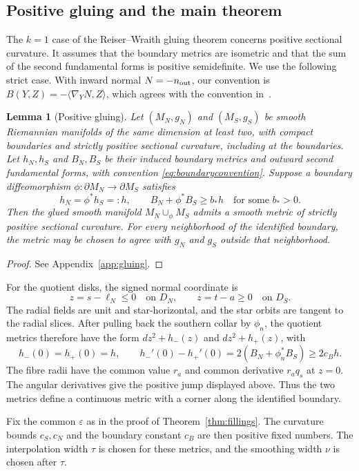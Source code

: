 \documentclass[12pt]{amsart}
\numberwithin{equation}{section}
\newtheorem{lemma}[theorem]{Lemma}
\theoremstyle{remark}
\newcommand{\eps}{\varepsilon}
\begin{document}
\subsection{Positive gluing and the main theorem}
The \(k=1\) case of the Reiser--Wraith gluing theorem
\cite[Theorem~A(i)]{RW} concerns positive sectional curvature.
It assumes that the boundary metrics are isometric and that the sum
of the second fundamental forms is positive semidefinite. We use the
following strict case. With inward normal \(N=-n_{\rm out}\), our
convention is \(B(Y,Z)=-\langle\nabla_YN,Z\rangle\), which agrees
with the convention in~\cite{RW}.

\begin{lemma}[Positive gluing]\label{lem:gluing}\label{thm:RW}
Let \((M_N,g_N)\) and \((M_S,g_S)\) be smooth Riemannian manifolds
of the same dimension at least two, with compact boundaries and
strictly positive sectional curvature, including at the boundaries.
Let \(h_N,h_S\) and \(B_N,B_S\) be their induced boundary metrics
and outward second fundamental forms, with convention
\eqref{eq:boundaryconvention}. Suppose a boundary diffeomorphism
\(\phi:\partial M_N\to\partial M_S\) satisfies
\[
 h_N=\phi^*h_S=:h,\qquad B_N+\phi^*B_S\ge b_*h
 \quad\text{for some }b_*>0.
\]
Then the glued smooth manifold \(M_N\cup_\phi M_S\) admits a smooth
metric of strictly positive sectional curvature. For every
neighborhood of the identified boundary, the metric may be chosen
to agree with \(g_N\) and \(g_S\) outside that neighborhood.
\end{lemma}
\begin{proof}
See Appendix~\ref{app:gluing}.
\end{proof}

For the quotient disks, the signed normal coordinate is
\[
 z=s-\ell_N\le0\quad\text{on }D_N,\qquad
 z=t-a\ge0\quad\text{on }D_S.
\]
The radial fields are unit and star-horizontal, and the star orbits
are tangent to the radial slices. After pulling back the southern
collar by \(\phi_n\), the quotient metrics therefore have the form
\(dz^2+h_-(z)\) and \(dz^2+h_+(z)\), with
\[
 h_-(0)=h_+(0)=h,\qquad
 h_-'(0)-h_+'(0)=2(B_N+\phi_n^*B_S)\ge2c_Bh.
\]
The fibre radii have the common value \(r_a\) and common derivative
\(r_aq_s\) at \(z=0\). The angular derivatives give the positive
jump displayed above. Thus the two metrics define a continuous
metric with a corner along the identified boundary.

Fix the common \(\eps\) as in the proof of
Theorem~\ref{thm:fillings}. The curvature bounds \(c_S,c_N\) and
the boundary constant \(c_B\) are then positive fixed numbers.
The interpolation width \(\tau\) is chosen for these metrics,
and the smoothing width \(\nu\) is chosen after \(\tau\).
\end{document}
